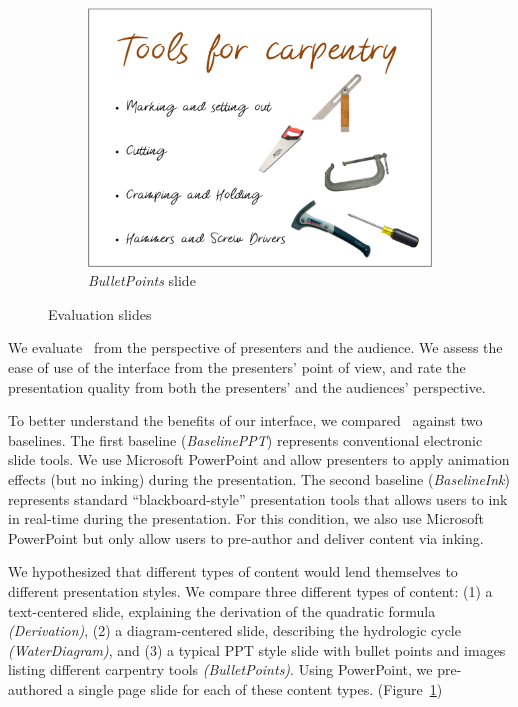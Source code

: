 \begin{figure}[t!]
\begin{subfigure}[t]{0.48\columnwidth}
        \includegraphics[width=1\columnwidth]{figures/tools}
        \caption{\textit{BulletPoints} slide}
    \end{subfigure}  
    \caption{Evaluation slides}
    \label{fig:studyslides}
\end{figure}

We evaluate \interface\ from the perspective of presenters and the audience. We assess the ease of use of the interface from the presenters' point of view, and rate the presentation quality from both the presenters' and the audiences' perspective.


To better understand the benefits of our interface, we compared \interface\ against two baselines. The first baseline (\textit{BaselinePPT}) represents conventional electronic slide tools.
%
We use Microsoft PowerPoint and allow presenters to apply animation effects (but no inking) during the presentation.
%
The second baseline (\textit{BaselineInk}) represents standard ``blackboard-style'' presentation tools that allows users to ink in real-time during the presentation.
%
For this condition, we also use Microsoft PowerPoint but only allow users to pre-author and deliver content via inking.

We hypothesized that different types of content would lend themselves to different presentation styles. We compare three different types of content: (1) a text-centered slide, explaining the derivation of the quadratic formula \textit{(Derivation)}, (2) a diagram-centered slide, describing the hydrologic cycle  \textit{(WaterDiagram)}, and (3) a typical PPT style slide with bullet points and images listing different carpentry tools \textit{(BulletPoints)}. Using PowerPoint, we pre-authored a single page slide for each of these content types. (Figure~\ref{fig:studyslides}) 
%

